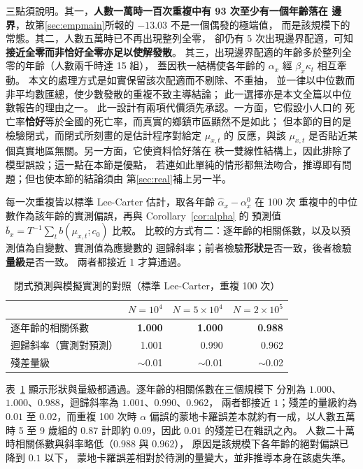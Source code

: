 \documentclass[UTF8, fontset=macnew, a4paper, 12pt]{ctexart}
\begin{document}
三點須說明。其一，\textbf{人數一萬時一百次重複中有 93 次至少有一個年齡落在
邊界}，故第\ref{sec:empmain}所報的 $-13.03$ 不是一個偶發的極端值，
而是該規模下的常態。其二，人數五萬時已不再出現整列全零，
卻仍有 5 次出現邊界配適，可知\textbf{接近全零而非恰好全零亦足以使解發散}。
其三，出現邊界配適的年齡多於整列全零的年齡（人數兩千時達 15 組），
蓋因秩一結構使各年齡的 $\alpha_x$ 經 $\beta_x\kappa_t$ 相互牽動。
本文的處理方式是如實保留該次配適而不剔除、不重抽，
並一律以中位數而非平均數匯總，使少數發散的重複不致主導結論；
此一選擇亦是本文全篇以中位數報告的理由之一。
此一設計有兩項代價須先承認。一方面，它假設小人口的
死亡率\textbf{恰好}等於全國的死亡率，而真實的鄉鎮市區顯然不是如此；
但本節的目的是檢驗閉式，而閉式所刻畫的是估計程序對給定 $\mu_{x,t}$ 的
反應，與該 $\mu_{x,t}$ 是否貼近某個真實地區無關。另一方面，它使資料恰好落在
秩一雙線性結構上，因此排除了模型誤設；這一點在本節是優點，
若連如此單純的情形都無法吻合，推導即有問題；但也使本節的結論須由
第\ref{sec:real}補上另一半。

每一次重複皆以標準 Lee-Carter 估計，取各年齡 $\hat\alpha_x-\alpha^{0}_x$ 在 100 次
重複中的中位數作為該年齡的實測偏誤，再與 Corollary~\ref{cor:alpha} 的
預測值 $\bar b_x=T^{-1}\sum_t b(\mu_{x,t};c_0)$ 比較。
比較的方式有二：逐年齡的相關係數，以及以預測值為自變數、實測值為應變數的
迴歸斜率；前者檢驗\textbf{形狀}是否一致，後者檢驗\textbf{量級}是否一致。
兩者都接近 $1$ 才算通過。


\begin{table}[H]
\centering
\caption{閉式預測與模擬實測的對照（標準 Lee-Carter，重複 100 次）}
\small
\begin{tabular}{lrrr}
\toprule
 & $N=10^4$ & $N=5\times10^4$ & $N=2\times10^5$\\
\midrule
逐年齡的相關係數 & \textbf{1.000} & \textbf{1.000} & \textbf{0.988}\\
迴歸斜率（實測對預測） & 1.001 & 0.990 & 0.962\\
殘差量級 & $\sim$0.01 & $\sim$0.01 & $\sim$0.02\\
\bottomrule
\end{tabular}
\label{tab:valid}
\end{table}

表~\ref{tab:valid} 顯示形狀與量級都通過。逐年齡的相關係數在三個規模下
分別為 $1.000$、$1.000$、$0.988$，迴歸斜率為 $1.001$、$0.990$、$0.962$，
兩者都接近 $1$；殘差的量級約為 $0.01$ 至 $0.02$，而重複 100 次時
$\alpha$ 偏誤的蒙地卡羅誤差本就約有一成，以人數五萬時 5 至 9 歲組的
$0.87$ 計即約 $0.09$，因此 $0.01$ 的殘差已在雜訊之內。
人數二十萬時相關係數與斜率略低（$0.988$ 與 $0.962$），
原因是該規模下各年齡的絕對偏誤已降到 $0.1$ 以下，
蒙地卡羅誤差相對於待測的量變大，並非推導本身在該處失準。
\end{document}
